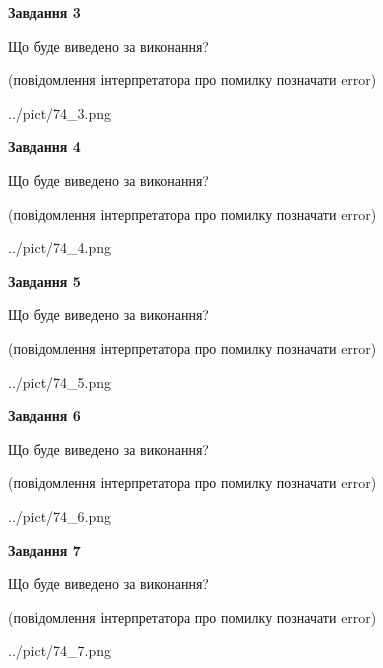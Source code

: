 \documentclass[12pt, ukrainian]{article}
\begin{document}
{\begin {large}
{\begin {center}\textbf{Завдання 3}\end {center}}\par
Що буде виведено за виконання?\par
 (повідомлення інтерпретатора про помилку позначати error)\par
\begin{center}
	{../pict/74_3.png}
\end{center}
\newpage

{\begin {center}\textbf{Завдання 4}\end {center}}\par
Що буде виведено за виконання?\par
 (повідомлення інтерпретатора про помилку позначати error)\par
\begin{center}
	{../pict/74_4.png}
\end{center}
\newpage

{\begin {center}\textbf{Завдання 5}\end {center}}\par
Що буде виведено за виконання?\par
 (повідомлення інтерпретатора про помилку позначати error)\par
\begin{center}
	{../pict/74_5.png}
\end{center}
\newpage

{\begin {center}\textbf{Завдання 6}\end {center}}\par
Що буде виведено за виконання?\par
 (повідомлення інтерпретатора про помилку позначати error)\par
\begin{center}
	{../pict/74_6.png}
\end{center}
\newpage

{\begin {center}\textbf{Завдання 7}\end {center}}\par
Що буде виведено за виконання?\par
 (повідомлення інтерпретатора про помилку позначати error)\par
\begin{center}
	{../pict/74_7.png}
\end{center}
\newpage


\end{large}}
\end{document}
